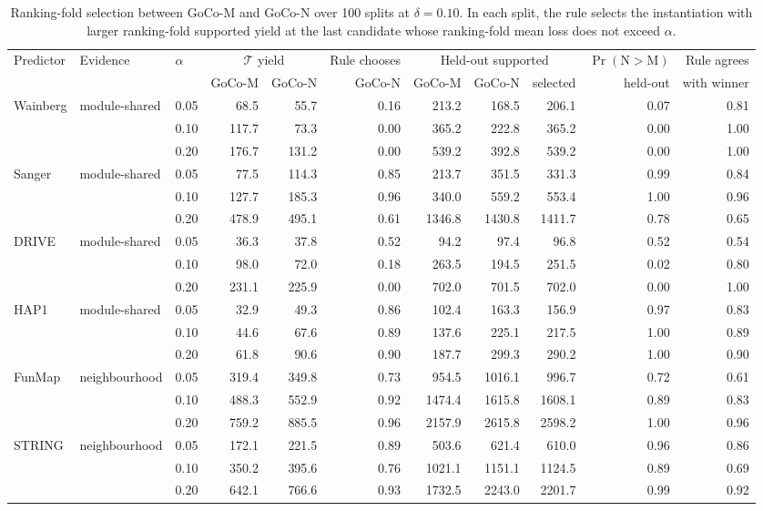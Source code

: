 \begin{table}[htbp]
\centering
\caption{Ranking-fold selection between GoCo-M and GoCo-N over 100 splits at $\delta=0.10$. In each split, the rule selects the instantiation with larger ranking-fold supported yield at the last candidate whose ranking-fold mean loss does not exceed $\alpha$.}
\label{tab:selection}
\scriptsize
\begin{tabular}{l l l rr r rrr r r}
\toprule
Predictor & Evidence & $\alpha$ & \multicolumn{2}{c}{$\mathcal T$ yield} & Rule chooses & \multicolumn{3}{c}{Held-out supported} & $\Pr(\text{N}>\text{M})$ & Rule agrees \\
 & & & GoCo-M & GoCo-N & GoCo-N & GoCo-M & GoCo-N & selected & held-out & with winner \\
\midrule
Wainberg & module-shared & 0.05 & 68.5 & 55.7 & 0.16 & 213.2 & 168.5 & 206.1 & 0.07 & 0.81 \\
 &  & 0.10 & 117.7 & 73.3 & 0.00 & 365.2 & 222.8 & 365.2 & 0.00 & 1.00 \\
 &  & 0.20 & 176.7 & 131.2 & 0.00 & 539.2 & 392.8 & 539.2 & 0.00 & 1.00 \\
\addlinespace[2pt]
Sanger & module-shared & 0.05 & 77.5 & 114.3 & 0.85 & 213.7 & 351.5 & 331.3 & 0.99 & 0.84 \\
 &  & 0.10 & 127.7 & 185.3 & 0.96 & 340.0 & 559.2 & 553.4 & 1.00 & 0.96 \\
 &  & 0.20 & 478.9 & 495.1 & 0.61 & 1346.8 & 1430.8 & 1411.7 & 0.78 & 0.65 \\
\addlinespace[2pt]
DRIVE & module-shared & 0.05 & 36.3 & 37.8 & 0.52 & 94.2 & 97.4 & 96.8 & 0.52 & 0.54 \\
 &  & 0.10 & 98.0 & 72.0 & 0.18 & 263.5 & 194.5 & 251.5 & 0.02 & 0.80 \\
 &  & 0.20 & 231.1 & 225.9 & 0.00 & 702.0 & 701.5 & 702.0 & 0.00 & 1.00 \\
\addlinespace[2pt]
HAP1 & module-shared & 0.05 & 32.9 & 49.3 & 0.86 & 102.4 & 163.3 & 156.9 & 0.97 & 0.83 \\
 &  & 0.10 & 44.6 & 67.6 & 0.89 & 137.6 & 225.1 & 217.5 & 1.00 & 0.89 \\
 &  & 0.20 & 61.8 & 90.6 & 0.90 & 187.7 & 299.3 & 290.2 & 1.00 & 0.90 \\
\midrule
FunMap & neighbourhood & 0.05 & 319.4 & 349.8 & 0.73 & 954.5 & 1016.1 & 996.7 & 0.72 & 0.61 \\
 &  & 0.10 & 488.3 & 552.9 & 0.92 & 1474.4 & 1615.8 & 1608.1 & 0.89 & 0.83 \\
 &  & 0.20 & 759.2 & 885.5 & 0.96 & 2157.9 & 2615.8 & 2598.2 & 1.00 & 0.96 \\
\addlinespace[2pt]
STRING & neighbourhood & 0.05 & 172.1 & 221.5 & 0.89 & 503.6 & 621.4 & 610.0 & 0.96 & 0.86 \\
 &  & 0.10 & 350.2 & 395.6 & 0.76 & 1021.1 & 1151.1 & 1124.5 & 0.89 & 0.69 \\
 &  & 0.20 & 642.1 & 766.6 & 0.93 & 1732.5 & 2243.0 & 2201.7 & 0.99 & 0.92 \\
\bottomrule
\end{tabular}
\end{table}
